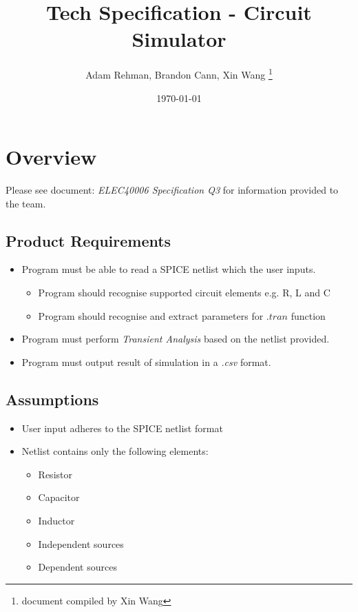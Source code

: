 \documentclass[a4paper, titlepage]{article}
\title{Tech Specification - Circuit Simulator}
\author{Adam Rehman, Brandon Cann, Xin Wang \thanks{document compiled by Xin Wang}}
\date{\today}
\begin{document}
    \maketitle
    \tableofcontents
    \pagebreak
 
    \section{Overview}
    Please see document: \textit{ELEC40006 Specification Q3} for information provided to the team. \par
    \subsection{Product Requirements}
    \begin{itemize}
        \item Program must be able to read a SPICE netlist which the user inputs.
        \begin{itemize}
            \item Program should recognise supported circuit elements e.g. R, L and C
            \item Program should recognise and extract parameters for $.tran$ function
        \end{itemize}
        \item Program must perform \textit{Transient Analysis} based on the netlist provided.
        \item Program must output result of simulation in a \textit{.csv} format.
    \end{itemize}
    \subsection{Assumptions}
    \begin{itemize}
        \item User input adheres to the SPICE netlist format
        \item Netlist contains only the following elements:
        \begin{itemize}
            \item Resistor
            \item Capacitor
            \item Inductor
            \item Independent sources
            \item Dependent sources
        \end{itemize}
    \end{itemize}
\end{document}

